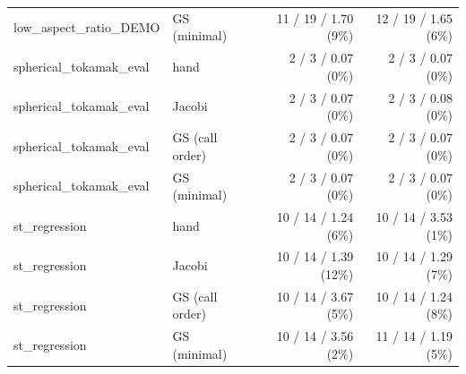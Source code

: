 \begin{tabular}{llrr}
low\_aspect\_ratio\_DEMO & GS (minimal) & 11 / 19 / 1.70 (9\%) & 12 / 19 / 1.65 (6\%) \\
spherical\_tokamak\_eval & hand & 2 / 3 / 0.07 (0\%) & 2 / 3 / 0.07 (0\%) \\
spherical\_tokamak\_eval & Jacobi & 2 / 3 / 0.07 (0\%) & 2 / 3 / 0.08 (0\%) \\
spherical\_tokamak\_eval & GS (call order) & 2 / 3 / 0.07 (0\%) & 2 / 3 / 0.07 (0\%) \\
spherical\_tokamak\_eval & GS (minimal) & 2 / 3 / 0.07 (0\%) & 2 / 3 / 0.07 (0\%) \\
st\_regression & hand & 10 / 14 / 1.24 (6\%) & 10 / 14 / 3.53 (1\%) \\
st\_regression & Jacobi & 10 / 14 / 1.39 (12\%) & 10 / 14 / 1.29 (7\%) \\
st\_regression & GS (call order) & 10 / 14 / 3.67 (5\%) & 10 / 14 / 1.24 (8\%) \\
st\_regression & GS (minimal) & 10 / 14 / 3.56 (2\%) & 11 / 14 / 1.19 (5\%) \\
\bottomrule
\end{tabular}
